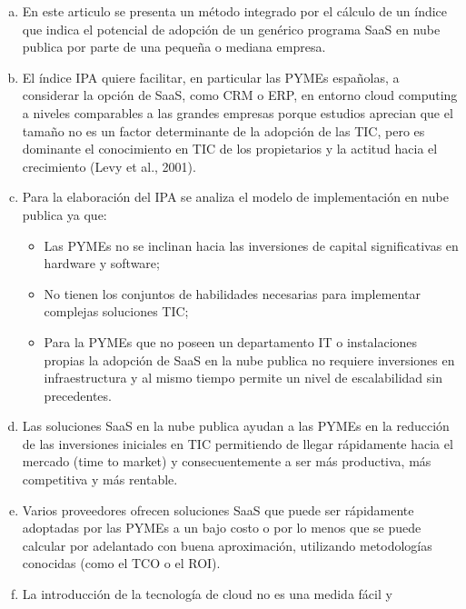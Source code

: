 \begin{enumerate}[a.]
    \item En este articulo se presenta un m\'etodo integrado por el c\'alculo de un
          \'indice que indica el potencial de adopci\'on de un gen\'erico programa SaaS
          en nube publica por parte de una peque\~na o mediana empresa.
    \item El \'indice IPA quiere facilitar, en particular las PYMEs espa\~nolas, a
          considerar la opci\'on de SaaS, como CRM o ERP, en entorno cloud computing
          a niveles comparables a las grandes empresas porque estudios aprecian que el
          tama\~no no es un factor determinante de la adopci\'on de las TIC, pero es
          dominante el conocimiento en TIC de los propietarios y la actitud hacia
          el crecimiento (Levy et al., 2001).
    \item Para la elaboraci\'on del IPA se analiza el modelo de implementaci\'on en
          nube publica ya que:
          \begin{itemize}
              \item Las PYMEs no se inclinan hacia las inversiones de capital
                    significativas en hardware y software;
              \item No tienen los conjuntos de habilidades necesarias para implementar
                    complejas soluciones TIC;
              \item Para la PYMEs que no poseen un departamento IT o instalaciones
                    propias la adopci\'on de SaaS en la nube publica no requiere
                    inversiones en infraestructura y al mismo tiempo permite un nivel de
                    escalabilidad sin precedentes.
          \end{itemize}
      \item Las soluciones SaaS en la nube publica ayudan a las PYMEs en la
            reducci\'on de las inversiones iniciales en TIC permitiendo de llegar
            r\'apidamente hacia el mercado (time to market) y consecuentemente a
            ser m\'as productiva, m\'as competitiva y m\'as rentable.
      \item Varios proveedores ofrecen soluciones SaaS que puede ser r\'apidamente
            adoptadas por las PYMEs a un bajo costo o por lo menos que se puede
            calcular por adelantado con buena aproximaci\'on, utilizando metodolog\'ias
            conocidas (como el TCO o el ROI).
      \item La introducci\'on de la tecnolog\'ia de cloud no es una medida f\'acil y

\end{enumerate}
